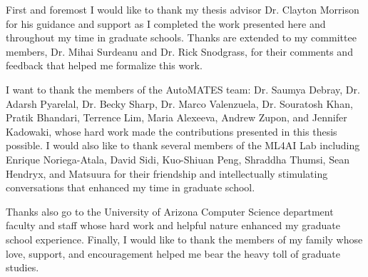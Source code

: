 First and foremost I would like to thank my thesis advisor Dr. Clayton Morrison for his guidance and support as I completed the work presented here and throughout my time in graduate schools.
Thanks are extended to my committee members, Dr. Mihai Surdeanu and Dr. Rick Snodgrass, for their comments and feedback that helped me formalize this work.

I want to thank the members of the AutoMATES team: Dr. Saumya Debray, Dr. Adarsh Pyarelal, Dr. Becky Sharp, Dr. Marco Valenzuela, Dr. Souratosh Khan, Pratik Bhandari, Terrence Lim, Maria Alexeeva, Andrew Zupon, and Jennifer Kadowaki, whose hard work made the contributions presented in this thesis possible.
I would also like to thank several members of the ML4AI Lab including Enrique Noriega-Atala, David Sidi, Kuo-Shiuan Peng, Shraddha Thumsi, Sean Hendryx, and Matsuura for their friendship and intellectually stimulating conversations that enhanced my time in graduate school.

Thanks also go to the University of Arizona Computer Science department faculty and staff whose hard work and helpful nature enhanced my graduate school experience.
Finally, I would like to thank the members of my family whose love, support, and encouragement helped me bear the heavy toll of graduate studies.

